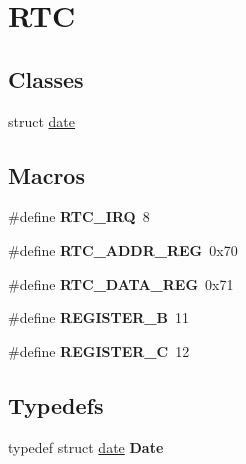 \hypertarget{group__RTC}{}\section{R\+TC}
\label{group__RTC}
\subsection*{Classes}
\begin{DoxyCompactItemize}
\item 
struct \hyperlink{structdate}{date}
\end{DoxyCompactItemize}
\subsection*{Macros}
\begin{DoxyCompactItemize}
\item 
\mbox{\label{group__RTC_ga4e22feb6ffbc1cda32fadff5c740dc51}} 
\#define {\bfseries R\+T\+C\+\_\+\+I\+RQ}~8
\item 
\mbox{\label{group__RTC_ga710b98232df2c563009e6f8a6cd18220}} 
\#define {\bfseries R\+T\+C\+\_\+\+A\+D\+D\+R\+\_\+\+R\+EG}~0x70
\item 
\mbox{\label{group__RTC_ga2f258a00c59c3f347c8d2d4a75471ce0}} 
\#define {\bfseries R\+T\+C\+\_\+\+D\+A\+T\+A\+\_\+\+R\+EG}~0x71
\item 
\mbox{\label{group__RTC_ga9935cde70013bbc215f658cfc078b988}} 
\#define {\bfseries R\+E\+G\+I\+S\+T\+E\+R\+\_\+B}~11
\item 
\mbox{\label{group__RTC_ga0b257ecb5a063988dce0560e2b30d7af}} 
\#define {\bfseries R\+E\+G\+I\+S\+T\+E\+R\+\_\+C}~12
\end{DoxyCompactItemize}
\subsection*{Typedefs}
\begin{DoxyCompactItemize}
\item 
\mbox{\label{group__RTC_gab8e06a427a2b4ef4f4d0cb455c5af012}} 
typedef struct \hyperlink{structdate}{date} {\bfseries Date}
\end{DoxyCompactItemize}
